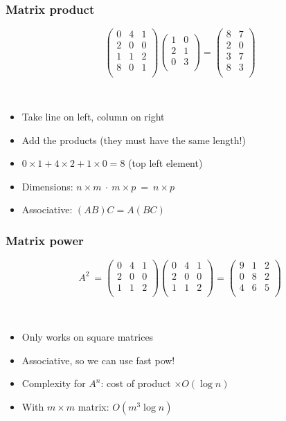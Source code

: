 \documentclass[12pt]{beamer}
\begin{document}
\begin{frame}
\frametitle{Matrix product}
\[
\left(
\begin{array}{ccc}
0&4&1\\
2&0&0\\
1&1&2\\
8&0&1\\
\end{array}
\right)
\left(
\begin{array}{cc}
1&0\\
2&1\\
0&3\\
\end{array}
\right)
=
\left(
\begin{array}{cc}
8&7\\
2&0\\
3&7\\
8&3\\
\end{array}
\right)
\]

~

\begin{itemize}
\item Take line on left, column on right
\item Add the products (they must have the same length!)
\item $0 \times 1 + 4 \times 2 + 1 \times 0 = 8$ (top left element)
\item Dimensions: $n \times m\ \cdot\ m \times p\ =\ n \times p$
\item Associative: $(AB)C = A(BC)$
\end{itemize}
\end{frame}

\begin{frame}
\frametitle{Matrix power}
\[
A^2\ =
\left(
\begin{array}{ccc}
0&4&1\\
2&0&0\\
1&1&2\\
\end{array}
\right)
\left(
\begin{array}{ccc}
0&4&1\\
2&0&0\\
1&1&2\\
\end{array}
\right)
=
\left(
\begin{array}{ccc}
9&1&2\\
0&8&2\\
4&6&5\\
\end{array}
\right)
\]

~

\begin{itemize}
\item Only works on square matrices
\item Associative, so we can use fast pow!
\item Complexity for $A^n$: cost of product $\times O(\log n)$
\item With $m \times m$ matrix: $O(m^3 \log n)$
\end{itemize}
\end{frame}
\end{document}
